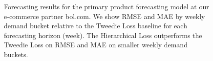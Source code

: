 \documentclass[preprint, 3p, times, twocolumn]{elsarticle}
\begin{document}
  \begin{figure}[t] 
     \quad
    \caption{Forecasting results for the primary product forecasting model at our e-commerce partner bol.com. We show RMSE and MAE by weekly demand bucket relative to the Tweedie Loss baseline for each forecasting horizon (week). The Hierarchical Loss outperforms the Tweedie Loss on RMSE and MAE on smaller weekly demand buckets.}
    \label{fig:bol_results}
  \end{figure}
\end{document}
